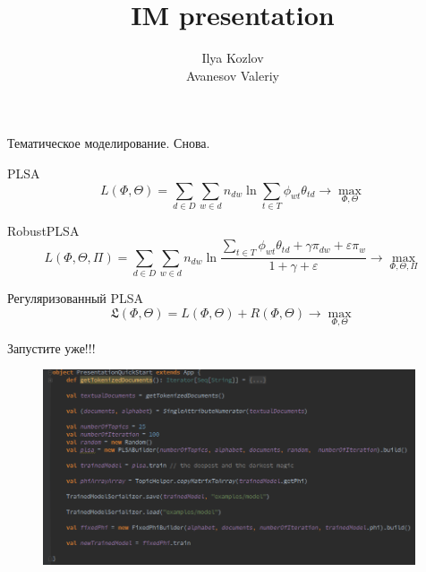 \documentclass{beamer}
\begin{document}
\title{IM presentation}  
\author{Ilya Kozlov \\Avanesov Valeriy}




\frame{\titlepage} 

\begin{frame}{Тематическое моделирование. Снова. }
	
	
	\begin{block}{PLSA}
			$$L(\Phi, \Theta) = \sum\limits_{d \in D} \sum\limits_{w \in d} 
	n_{dw} \ln \sum\limits_{t \in T} \phi_{wt}\theta_{td} \rightarrow \max\limits_{\Phi, \Theta}$$
	\end{block}
	\begin{block}{RobustPLSA}
			$$L(\Phi, \Theta, \Pi) = \sum\limits_{d \in D} \sum\limits_{w \in d} 
	n_{dw} \ln \frac{ \sum_{t \in T} \phi_{wt}\theta_{td} + \gamma \pi_{dw} + \varepsilon \pi_w  }{1+\gamma+\varepsilon} \rightarrow \max\limits_{\Phi, \Theta, \Pi}$$	
	\end{block}
	
	\begin{block}{Регуляризованный PLSA}
		$$\mathfrak{L}(\Phi, \Theta) =  L(\Phi, \Theta) + R(\Phi, \Theta) \rightarrow \max\limits_{\Phi, \Theta} $$
	\end{block}
	
\end{frame}

\begin{frame}{Запустите уже!!!}
\begin{figure}[ht!]
\centering
\includegraphics[width=110mm]{quckstart}
\label{overflow}
\end{figure}
\end{frame}
\end{document}
